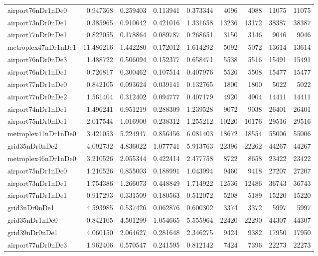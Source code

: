 \begin{longtable}{|l|r|r|r|r|r|r|r|r|}
airport76nDr1nDe0 & 0.947368 & 0.259403 & 0.113941 & 0.373344 & 4096 & 4088 & 11075 & 11075 \\
airport73nDr0nDe1 & 0.385965 & 0.910642 & 0.421016 & 1.331658 & 13236 & 13172 & 38387 & 38387 \\
airport77nDr0nDe1 & 0.822055 & 0.178864 & 0.089787 & 0.268651 & 3150 & 3146 & 9046 & 9046 \\
metroplex47nDr1nDe1 & 11.486216 & 1.442280 & 0.172012 & 1.614292 & 5092 & 5072 & 13614 & 13614 \\
airport76nDr0nDe3 & 1.488722 & 0.506094 & 0.152377 & 0.658471 & 5538 & 5516 & 15491 & 15491 \\
airport76nDr1nDe1 & 0.726817 & 0.300462 & 0.107514 & 0.407976 & 5526 & 5508 & 15477 & 15477 \\
airport77nDr1nDe0 & 0.842105 & 0.093624 & 0.039141 & 0.132765 & 1800 & 1800 & 5022 & 5022 \\
airport77nDr0nDe2 & 1.561404 & 0.312402 & 0.094777 & 0.407179 & 4920 & 4904 & 14411 & 14411 \\
airport74nDr1nDe1 & 1.496241 & 0.951219 & 0.288309 & 1.239528 & 9072 & 9038 & 26401 & 26401 \\
airport75nDr0nDe1 & 2.017544 & 1.016900 & 0.238312 & 1.255212 & 10220 & 10176 & 29516 & 29516 \\
metroplex41nDr1nDe0 & 3.421053 & 5.224947 & 0.856456 & 6.081403 & 18672 & 18554 & 55006 & 55006 \\
grid35nDr0nDe2 & 4.092732 & 4.836022 & 1.077741 & 5.913763 & 22396 & 22262 & 44267 & 44267 \\
metroplex46nDr1nDe0 & 3.210526 & 2.055344 & 0.422414 & 2.477758 & 8722 & 8658 & 23422 & 23422 \\
airport75nDr1nDe0 & 1.210526 & 0.855003 & 0.188991 & 1.043994 & 9460 & 9418 & 27207 & 27207 \\
airport73nDr1nDe1 & 1.754386 & 1.266073 & 0.448849 & 1.714922 & 12536 & 12486 & 36743 & 36743 \\
airport77nDr1nDe1 & 0.917293 & 0.331509 & 0.180563 & 0.512072 & 5208 & 5189 & 15220 & 15220 \\
grid3nDr0nDe1 & 4.593985 & 0.537426 & 0.062876 & 0.600302 & 3374 & 3372 & 5997 & 5997 \\
grid35nDr1nDe0 & 0.842105 & 4.501299 & 1.054665 & 5.555964 & 22420 & 22290 & 44307 & 44307 \\
grid39nDr0nDe1 & 4.060150 & 2.064627 & 0.281648 & 2.346275 & 9424 & 9382 & 17950 & 17950 \\
airport77nDr0nDe3 & 1.962406 & 0.570547 & 0.241595 & 0.812142 & 7424 & 7396 & 22273 & 22273 \\

\end{longtable}
